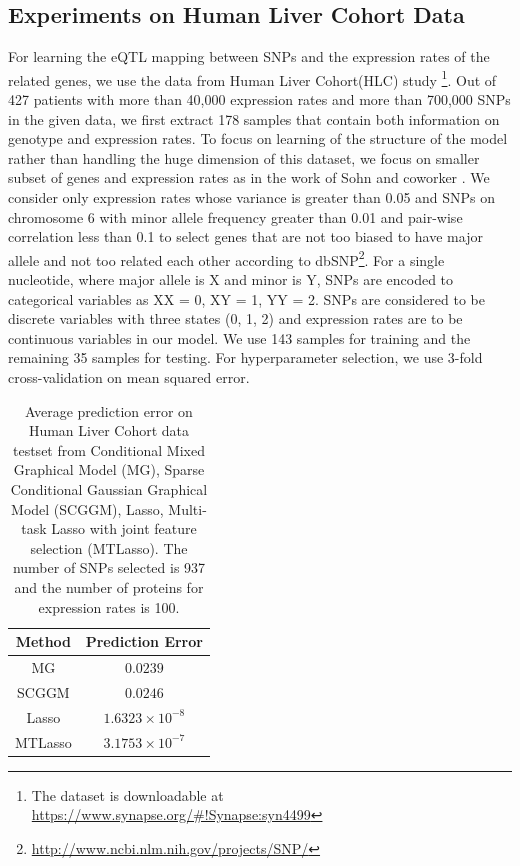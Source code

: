 \documentclass{article}
\begin{document}
\subsection{Experiments on Human Liver Cohort Data}
For learning the eQTL mapping between SNPs and the expression rates of the related genes, we use the data from Human Liver Cohort(HLC) study \cite{schadt2008mapping} \footnote{The dataset is downloadable at \url{ https://www.synapse.org/\#!Synapse:syn4499}}. Out of 427 patients with more than 40,000 expression rates and more than 700,000 SNPs in the given data, we first extract 178 samples that contain both information on genotype and expression rates. To focus on learning of the structure of the model rather than handling the huge dimension of this dataset, we focus on smaller subset of genes and expression rates as in the work of Sohn and coworker \cite{sohn2012joint}. We consider only expression rates whose variance is greater than 0.05 and SNPs on chromosome 6 with minor allele frequency greater than 0.01 and pair-wise correlation less than 0.1 to select genes that are not too biased to have major allele and not too related each other according to dbSNP\footnote{\url{http://www.ncbi.nlm.nih.gov/projects/SNP/}}. For a single nucleotide, where major allele is X and minor is Y, SNPs are encoded to categorical variables as XX = 0, XY = 1, YY = 2. SNPs are considered to be discrete variables with three states (0, 1, 2) and expression rates are to be continuous variables in our model. We use 143 samples for training and the remaining 35 samples for testing. For hyperparameter selection, we use 3-fold cross-validation on mean squared error.


\begin{table}
\begin{center}
    \begin{tabular}{| c | c |}
    \hline
    Method & Prediction Error \\
    \hline
    MG & $0.0239$ \\
    SCGGM & $0.0246$  \\
    Lasso & $1.6323 \times 10^{-8}$  \\
    MTLasso & $3.1753 \times 10^{-7}$ \\
    \hline 
    \end{tabular}
\end{center}
\caption{Average prediction error on Human Liver Cohort data testset from Conditional Mixed Graphical Model (MG), Sparse Conditional Gaussian Graphical Model (SCGGM), Lasso, Multi-task Lasso with joint feature selection (MTLasso). The number of SNPs selected is 937 and the number of proteins for expression rates is 100.}
\label{table:real_large}
\end{table}
\end{document}
